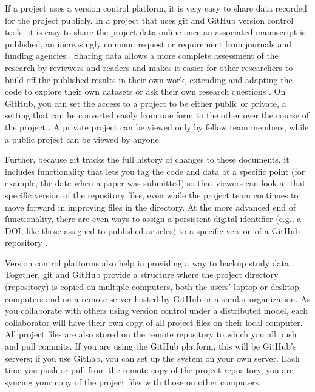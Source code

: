 \documentclass[]{tufte-book}
\begin{document}
If a project uses a version control platform, it is very easy to share data recorded
for the project publicly. In a project that uses git and GitHub version control
tools, it is easy to share the project data online once an associated manuscript
is published, an increasingly common request or requirement from journals and
funding agencies \citep{blischak2016quick}. Sharing data allows a more complete
assessment of the research by reviewers and readers and makes it easier for
other researchers to build off the published results in their own work,
extending and adapting the code to explore their own datasets or ask their own
research questions \citep{perez2016ten}. On GitHub, you can set the access to a
project to be either public or private, a setting that can be converted easily from one
form to the other over the course of the project \citep{metz2015github}. A private
project can be viewed only by fellow team members, while a public project can be
viewed by anyone.

Further, because git tracks the full history of changes to
these documents, it includes functionality that lets you tag the code and data
at a specific point (for example, the date when a paper was submitted) so that
viewers can look at that specific version of the repository files, even while
the project team continues to move forward in improving files in the directory.
At the more advanced end of functionality, there are even ways to assign a
persistent digital identifier (e.g., a DOI, like those assigned to published articles)
to a specific version of a GitHub repository \citep{perez2016ten}.

Version control platforms also help in providing a way to backup study data
\citep{blischak2016quick, perez2016ten, perkel2018git}. Together, git and GitHub
provide a structure where the project directory (repository) is copied on
multiple computers, both the users' laptop or desktop computers and on a remote
server hosted by GitHub or a similar organization. As you collaborate with
others using version control under a distributed model, each collaborator will
have their own copy of all project files on their local computer. All project
files are also stored on the remote repository to which you all push and pull
commits. If you are using the GitHub platform, this will be GitHub's servers; if
you use GitLab, you can set up the system on your own server. Each time you push
or pull from the remote copy of the project repository, you are syncing your
copy of the project files with those on other computers.
\end{document}
